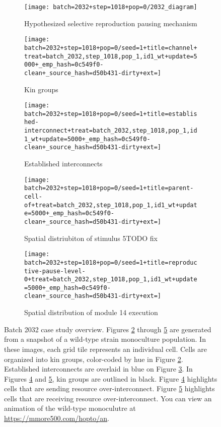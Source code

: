 \begin{figure}[!htbp]

\begin{center}
\begin{subfigure}[b]{\linewidth}
  \texttt{[image: batch=2032+step=1018+pop=0/2032\_diagram]}
  \caption{Hypothesized selective reproduction pausing mechanism}
  \label{fig:mechanism2}
\end{subfigure}
\begin{subfigure}[b]{0.45\linewidth}
  \texttt{[image: batch=2032+step=1018+pop=0/seed=1+title=channel+treat=batch\_2032,step\_1018,pop\_1,id1\_wt+update=5000+\_emp\_hash=0c549f0-clean+\_source\_hash=d50b431-dirty+ext=]}
  \caption{Kin groups}
  \label{fig:kingroups2}
\end{subfigure}
\begin{subfigure}[b]{0.45\linewidth}
  \texttt{[image: batch=2032+step=1018+pop=0/seed=1+title=established-interconnect+treat=batch\_2032,step\_1018,pop\_1,id1\_wt+update=5000+\_emp\_hash=0c549f0-clean+\_source\_hash=d50b431-dirty+ext=]}
  \caption{Established interconnects}
  \label{fig:establishedinterconnects2}
\end{subfigure}
\begin{subfigure}[b]{0.45\linewidth}
  \texttt{[image: batch=2032+step=1018+pop=0/seed=1+title=parent-cell-of+treat=batch\_2032,step\_1018,pop\_1,id1\_wt+update=5000+\_emp\_hash=0c549f0-clean+\_source\_hash=d50b431-dirty+ext=]}
  \caption{Spatial distriubiton of stimulus 5TODO fix}
  \label{fig:t5distribution}
\end{subfigure}
\begin{subfigure}[b]{0.45\linewidth}
  \texttt{[image: batch=2032+step=1018+pop=0/seed=1+title=reproductive-pause-level-0+treat=batch\_2032,step\_1018,pop\_1,id1\_wt+update=5000+\_emp\_hash=0c549f0-clean+\_source\_hash=d50b431-dirty+ext=]}
  \caption{Spatial distribution of module 14 execution}
  \label{fig:m14distribution}
\end{subfigure}
\caption{
Batch 2032 case study overview.
Figures \ref{fig:kingroups2} through \ref{fig:m14distribution} are generated from a snapshot of a wild-type strain monoculture population.
In these images, each grid tile represents an individual cell.
Cells are organized into kin groups, color-coded by hue in Figure \ref{fig:kingroups2}.
Established interconnects are overlaid in blue on Figure \ref{fig:establishedinterconnects2}.
In Figures \ref{fig:t5distribution} and \ref{fig:m14distribution}, kin groups are outlined in black.
Figure \ref{fig:t5distribution} highlights cells that are sending resource over-interconnect.
Figure \ref{fig:m14distribution} highlights cells that are receiving resource over-interconnect.
You can view an animation of the wild-type monoculutre at \url{https://mmore500.com/hopto/an}.
}
\label{fig:case_study_2032}
\end{center}
\end{figure}
